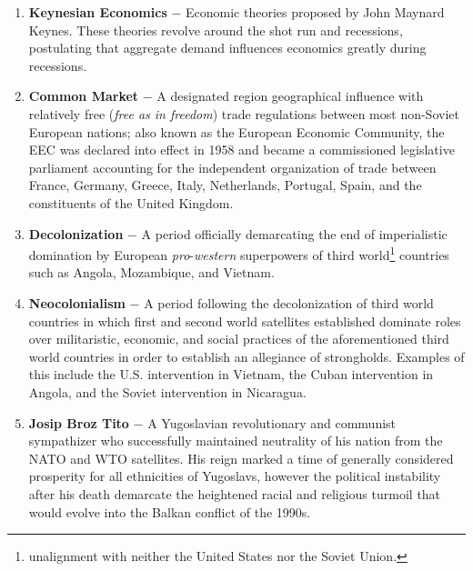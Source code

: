 \documentclass[12pt]{article}
\begin{document}
\begin{flushleft}
\begin{enumerate}
	\item \textbf{Keynesian Economics} $-$ Economic theories proposed by John Maynard Keynes. These theories revolve around the shot run and recessions, postulating that aggregate demand influences economics greatly during recessions.

    \item \textbf{Common Market} $-$ A designated region geographical influence with relatively free (\emph{free as in freedom}) trade regulations between most non-Soviet European nations; also known as the European Economic Community, the EEC was declared into effect in 1958 and became a commissioned legislative parliament accounting for the independent organization of trade between France, Germany, Greece, Italy, Netherlands, Portugal, Spain, and the constituents of the United Kingdom. 

    \item \textbf{Decolonization} $-$ A period officially demarcating the end of imperialistic domination by European \emph{pro}-\emph{western} superpowers of third world\footnote{unalignment with neither the United States nor the Soviet Union.} countries such as Angola, Mozambique, and Vietnam.
      
    \item \textbf{Neocolonialism} $-$ A period following the decolonization of third world countries in which first and second world satellites established dominate roles over militaristic, economic, and social practices of the aforementioned third world countries in order to establish an allegiance of strongholds. Examples of this include the U.S. intervention in Vietnam, the Cuban intervention in Angola, and the Soviet intervention in Nicaragua.

    \item \textbf{Josip Broz Tito} $-$ A Yugoslavian revolutionary and communist sympathizer who successfully maintained neutrality of his nation from the NATO and WTO satellites. His reign marked a time of generally considered prosperity for all ethnicities of Yugoslavs, however the political instability after his death demarcate the heightened racial and religious turmoil that would evolve into the Balkan conflict of the 1990s.


\end{enumerate}
\end{flushleft}
\end{document}
